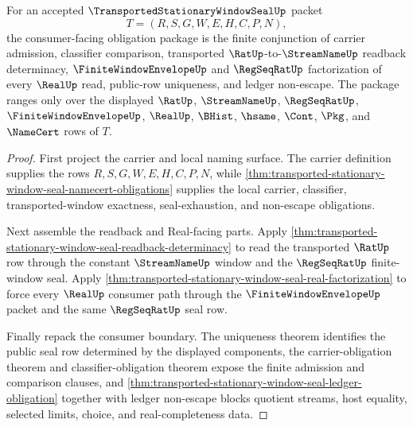 \begin{theorem}
\label{thm:transported-stationary-window-seal-obligation-package}
For an accepted $\TransportedStationaryWindowSealUp$ packet
$$
T=(R,S,G,W,E,H,C,P,N),
$$
the consumer-facing obligation package is the finite conjunction of carrier admission, classifier comparison, transported $\RatUp$-to-$\StreamNameUp$ readback determinacy, $\FiniteWindowEnvelopeUp$ and $\RegSeqRatUp$ factorization of every $\RealUp$ read, public-row uniqueness, and ledger non-escape. The package ranges only over the displayed $\RatUp$, $\StreamNameUp$, $\RegSeqRatUp$, $\FiniteWindowEnvelopeUp$, $\RealUp$, $\BHist$, $\hsame$, $\Cont$, $\Pkg$, and $\NameCert$ rows of $T$.
\end{theorem}
\begin{proof}
First project the carrier and local naming surface. The carrier definition supplies the rows $R,S,G,W,E,H,C,P,N$, while \autoref{thm:transported-stationary-window-seal-namecert-obligations} supplies the local carrier, classifier, transported-window exactness, seal-exhaustion, and non-escape obligations.

Next assemble the readback and Real-facing parts. Apply \autoref{thm:transported-stationary-window-seal-readback-determinacy} to read the transported $\RatUp$ row through the constant $\StreamNameUp$ window and the $\RegSeqRatUp$ finite-window seal. Apply \autoref{thm:transported-stationary-window-seal-real-factorization} to force every $\RealUp$ consumer path through the $\FiniteWindowEnvelopeUp$ packet and the same $\RegSeqRatUp$ seal row.

Finally repack the consumer boundary. The uniqueness theorem identifies the public seal row determined by the displayed components, the carrier-obligation theorem and classifier-obligation theorem expose the finite admission and comparison clauses, and \autoref{thm:transported-stationary-window-seal-ledger-obligation} together with ledger non-escape blocks quotient streams, host equality, selected limits, choice, and real-completeness data.
\end{proof}

